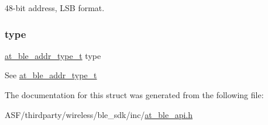 48-\/bit address, L\+SB format. \mbox{\label{structat__ble__addr__t_ad1b08ab8241c7861e6beb41cd9518f40}} 
\subsubsection{\texorpdfstring{type}{type}}
{\footnotesize\ttfamily \mbox{\hyperlink{at__ble__api_8h_aab076e537bd99ea1be0fbf95a2d16be4}{at\+\_\+ble\+\_\+addr\+\_\+type\+\_\+t}} type}

See \mbox{\hyperlink{at__ble__api_8h_aab076e537bd99ea1be0fbf95a2d16be4}{at\+\_\+ble\+\_\+addr\+\_\+type\+\_\+t}} 

The documentation for this struct was generated from the following file\+:\begin{DoxyCompactItemize}
\item 
A\+S\+F/thirdparty/wireless/ble\+\_\+sdk/inc/\mbox{\hyperlink{at__ble__api_8h}{at\+\_\+ble\+\_\+api.\+h}}\end{DoxyCompactItemize}

